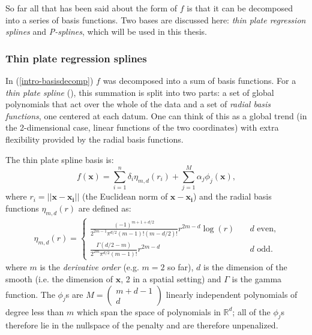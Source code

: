 So far all that has been said about the form of $f$ is that it can be decomposed into a series of basis functions. Two bases are discussed here: \textit{thin plate regression splines} and \textit{P-splines}, which will be used in this thesis.

\subsubsection{Thin plate regression splines}
\label{GAMtprs}
\label{GAMtprspenalty}

In (\ref{intro-basisdecomp}) $f$ was decomposed into a sum of basis functions. For a \textit{thin plate spline} (\cite{duchon77}), this summation is split into two parts: a set of global polynomials that act over the whole of the data and a set of \textit{radial basis functions}, one centered at each datum. One can think of this as a global trend (in the 2-dimensional case, linear functions of the two coordinates) with extra flexibility provided by the radial basis functions.

The thin plate spline basis is:
\begin{equation}
f(\mathbf{x}) = \sum_{i=1}^n \delta_i \eta_{m,d}(r_i) + \sum_{j=1}^M \alpha_j \phi_j(\mathbf{x}),
\label{tprs-basis} 
\end{equation}
where $r_i=\lvert \lvert \mathbf{x}-\mathbf{x_i}\rvert \rvert$ (the Euclidean norm of $ \mathbf{x}-\mathbf{x_i}$) and the radial basis functions $\eta_{m,d}(r)$ are defined as:
\begin{align*}
\eta_{m,d}(r) =\begin{cases} \frac{(-1)^{m+1+d/2}}{2^{2m-1}\pi^{d/2}(m-1)!(m-d/2)!} r^{2m-d} \log(r) &\quad{\text{$d$ even,}}\\
\frac{\Gamma(d/2-m)}{2^{2m}\pi^{d/2}(m-1)!} r^{2m-d} &\quad{\text{$d$ odd.}}
\end{cases}
\end{align*}
where $m$ is the \textit{derivative order} (e.g. $m=2$ so far), $d$ is the dimension of the smooth (i.e. the dimension of $\mathbf{x}$, 2 in a spatial setting) and $\Gamma$ is the gamma function. The $\phi_j$s are $M=\left( \begin{smallmatrix} m+d-1 \\ d  \end{smallmatrix}\right)$ linearly independent polynomials of degree less than $m$ which span the space of polynomials in $\mathbb{R}^d$; all of the $\phi_j$s therefore lie in the nullspace of the penalty and are therefore unpenalized.

